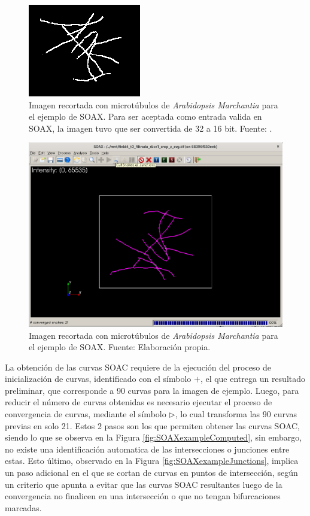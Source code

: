 \begin{figure}[h]
    \centering
    \includegraphics[scale=0.8]{evalImages/field4-t0-z-avg.png}
    \caption[Imagen de ejemplo de SOAX]{Imagen recortada con microt\'ubulos de {\it Arabidopsis Marchantia} para el ejemplo de SOAX. Para ser aceptada como entrada valida en SOAX, la imagen tuvo que ser convertida de 32 a 16 bit. Fuente: \citet{Llanos2021microtubulos}.}
    \label{fig:SOAXexample}
\end{figure}


\begin{figure}[h]
    \centering
    \includegraphics[scale=0.3]{evalImages/field4-soax.png}
    \caption[Imagen de ejemplo de SOAX]{Imagen recortada con microt\'ubulos de {\it Arabidopsis Marchantia} para el ejemplo de SOAX. Fuente: Elaboraci\'on propia.}
    \label{fig:SOAXexample}
\end{figure}

La obtenci\'on de las curvas SOAC requiere de la ejecuci\'on del proceso de inicializaci\'on de curvas, identificado con el s\'imbolo $+$, el que entrega un resultado preliminar, que corresponde a 90 curvas para la imagen de ejemplo. Luego, para reducir el n\'umero de curvas obtenidas es necesario ejecutar el proceso de convergencia de curvas, mediante el s\'imbolo $\rhd$, lo cual transforma las 90 curvas previas en solo 21. Estos 2 pasos son los que permiten obtener las curvas SOAC, siendo lo que se observa en la Figura \ref{fig:SOAXexampleComputed}, sin embargo, no existe una identificaci\'on automatica de las intersecciones o junciones entre estas. Esto \'ultimo, observado en la Figura \ref{fig:SOAXexampleJunctions}, implica un paso adicional en el que se cortan de curvas en puntos de intersecci\'on, seg\'un un criterio que apunta a evitar que las curvas SOAC resultantes luego de la convergencia no finalicen en una intersecci\'on o que no tengan bifurcaciones marcadas.

